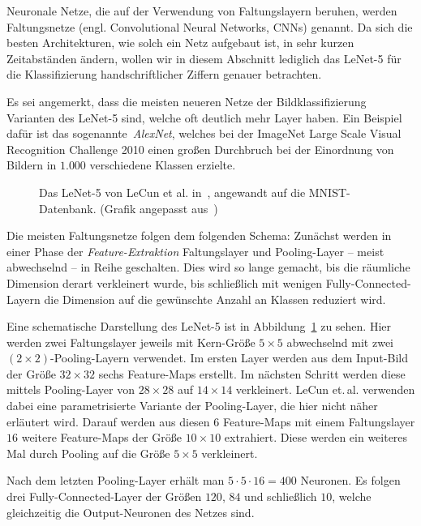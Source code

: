 \documentclass[paper=a4, 	%
		fontsize=11pt,
		abstract=true, 	%
		headsepline, 	%
		notitlepage	%
		]{scrartcl}
\theoremstyle{definition}
\begin{document}
Neuronale Netze, die auf der Verwendung von Faltungslayern beruhen, werden Faltungsnetze (engl. \foreignlanguage{english}{Convolutional Neural Networks, CNNs}) genannt.
Da sich die besten Architekturen, wie solch ein Netz aufgebaut ist, in sehr kurzen Zeitabständen ändern, wollen wir in diesem Abschnitt lediglich das LeNet-5 für die Klassifizierung handschriftlicher Ziffern genauer betrachten.

Es sei angemerkt, dass die meisten neueren Netze der Bildklassifizierung Varianten des LeNet-5 sind, welche oft deutlich mehr Layer haben.
Ein Beispiel dafür ist das sogenannte~\emph{AlexNet}, welches bei der ImageNet Large Scale Visual Recognition Challenge 2010 \cite{ILSVRC15} einen großen Durchbruch bei der Einordnung von Bildern in $1{.}000$ verschiedene Klassen erzielte.

\begin{figure}
    \noindent\makebox[\textwidth]{
        \newcommand{\svgwidth}{1.2\textwidth}
        \scriptsize
        
    }
    \caption{Das LeNet-5 von LeCun et al. in~\cite{lecun1998}, angewandt auf die MNIST-Datenbank.
    {\scriptsize(Grafik angepasst aus~\cite{lecun1998})}}
    \label{fig:lenet-5}
\end{figure}

Die meisten Faltungsnetze folgen dem folgenden Schema:
Zunächst werden in einer Phase der \emph{Feature-Extraktion} Faltungslayer und Pooling-Layer -- meist abwechselnd -- in Reihe geschalten.
Dies wird so lange gemacht, bis die räumliche Dimension derart verkleinert wurde, bis schließlich mit wenigen Fully-Connected-Layern die Dimension auf die gewünschte Anzahl an Klassen reduziert wird.

Eine schematische Darstellung des LeNet-5 ist in Abbildung~\ref{fig:lenet-5} zu sehen.
Hier werden zwei Faltungslayer jeweils mit Kern-Größe $5\times 5$ abwechselnd mit zwei $(2\times 2)$-Pooling-Layern verwendet.
Im ersten Layer werden aus dem Input-Bild der Größe $32\times 32$ sechs Feature-Maps erstellt.
Im nächsten Schritt werden diese mittels Pooling-Layer von $28\times 28$ auf $14\times 14$ verkleinert.
LeCun et.\,al. verwenden dabei eine parametrisierte Variante der Pooling-Layer, die hier nicht näher erläutert wird.
Darauf werden aus diesen $6$ Feature-Maps mit einem Faltungslayer $16$ weitere Feature-Maps der Größe $10\times 10$ extrahiert.
Diese werden ein weiteres Mal durch Pooling auf die Größe $5\times 5$ verkleinert.

Nach dem letzten Pooling-Layer erhält man $5\cdot 5\cdot 16 = 400$ Neuronen.
Es folgen drei Fully-Connected-Layer der Größen $120$, $84$ und schließlich $10$, welche gleichzeitig die Output-Neuronen des Netzes sind.
\end{document}
